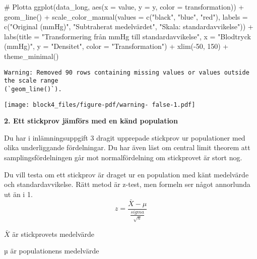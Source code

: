 \documentclass[
  letterpaper,
  DIV=11,
  numbers=noendperiod]{scrartcl}
\newenvironment{Shaded}{\begin{snugshade}}{\end{snugshade}}
\newcommand{\AttributeTok}[1]{\textcolor[rgb]{0.40,0.45,0.13}{#1}}
\newcommand{\CommentTok}[1]{\textcolor[rgb]{0.37,0.37,0.37}{#1}}
\newcommand{\DecValTok}[1]{\textcolor[rgb]{0.68,0.00,0.00}{#1}}
\newcommand{\FunctionTok}[1]{\textcolor[rgb]{0.28,0.35,0.67}{#1}}
\newcommand{\NormalTok}[1]{\textcolor[rgb]{0.00,0.23,0.31}{#1}}
\newcommand{\SpecialCharTok}[1]{\textcolor[rgb]{0.37,0.37,0.37}{#1}}
\newcommand{\StringTok}[1]{\textcolor[rgb]{0.13,0.47,0.30}{#1}}
\begin{document}
\begin{Shaded}
\begin{Highlighting}[]
\CommentTok{\# Plotta}
\FunctionTok{ggplot}\NormalTok{(data\_long, }\FunctionTok{aes}\NormalTok{(}\AttributeTok{x =}\NormalTok{ value, }\AttributeTok{y =}\NormalTok{ y, }\AttributeTok{color =}\NormalTok{ transformation)) }\SpecialCharTok{+}
  \FunctionTok{geom\_line}\NormalTok{() }\SpecialCharTok{+}
  \FunctionTok{scale\_color\_manual}\NormalTok{(}\AttributeTok{values =} \FunctionTok{c}\NormalTok{(}\StringTok{"black"}\NormalTok{, }\StringTok{"blue"}\NormalTok{, }\StringTok{"red"}\NormalTok{),}
                     \AttributeTok{labels =} \FunctionTok{c}\NormalTok{(}\StringTok{"Original (mmHg)"}\NormalTok{,}
                                \StringTok{"Subtraherat medelvärdet"}\NormalTok{,}
                                \StringTok{"Skala: standardavvikelse"}\NormalTok{)) }\SpecialCharTok{+}
  \FunctionTok{labs}\NormalTok{(}\AttributeTok{title =} \StringTok{"Transformering från mmHg till standardavvikelse"}\NormalTok{,}
       \AttributeTok{x =} \StringTok{"Blodtryck (mmHg)"}\NormalTok{,}
       \AttributeTok{y =} \StringTok{"Densitet"}\NormalTok{,}
       \AttributeTok{color =} \StringTok{"Transformation"}\NormalTok{) }\SpecialCharTok{+}
  \FunctionTok{xlim}\NormalTok{(}\SpecialCharTok{{-}}\DecValTok{50}\NormalTok{, }\DecValTok{150}\NormalTok{) }\SpecialCharTok{+}
  \FunctionTok{theme\_minimal}\NormalTok{()}
\end{Highlighting}
\end{Shaded}

\begin{verbatim}
Warning: Removed 90 rows containing missing values or values outside the scale range
(`geom_line()`).
\end{verbatim}

\texttt{[image: block4\_files/figure-pdf/warning- false-1.pdf]}

\textbf{2. Ett stickprov jämförs med en känd population}

Du har i inlämningsuppgift 3 dragit upprepade stickprov ur populationer
med olika underliggande fördelningar. Du har även läst om central limit
theorem att samplingsfördelningen går mot normalfördelning om
stickprovet är stort nog.

Du vill testa om ett stickprov är draget ur en population med känt
medelvärde och standardavvikelse. Rätt metod är z-test, men formeln ser
något annorlunda ut än i 1. \[
z = \frac{\bar{X} - \mu}{\frac{sigma}{\sqrt{n}}}
\]

\(\bar{X}\) är stickprovets medelvärde

\(µ\) är populationens medelvärde
\end{document}
